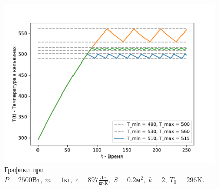         \begin{figure}[H]
            \centering
            \includegraphics[width=11cm]{pictures/utug4.pdf}
            \caption{Графики при $P = 2500 \text{Вт}, ~ m = 1 \text{кг}, ~ c = 897 \frac{\text{Дж}}{\text{кг} \cdot \text{К}}, ~ S = 0.2 \text{м}^2, ~ k = 2, ~ T_0 = 296 \text{K}$.}
        \end{figure}


